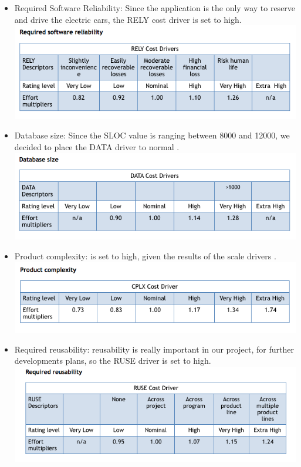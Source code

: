 \documentclass{article}
\begin{document}
\begin{flushleft}
\begin{itemize}
\item Required Software Reliability:
Since the application is the only way to reserve and drive the electric cars, the RELY cost driver is set to high.\\
\vspace{0.5cm}
\includegraphics[scale=0.5]{cocomo/1_RELY}
\vspace{0.5cm}
\item Database size: 
Since the SLOC value is ranging between 8000 and 12000, we decided to place the DATA driver to normal .\\
\vspace{0.5cm}
\includegraphics[scale=0.5]{cocomo/2_DATA}
\vspace{0.5cm}
\item Product complexity:  is set to high, given the results of the scale drivers .\\
\vspace{0.5cm}
\includegraphics[scale=0.5]{cocomo/3_CPLX}
\vspace{0.5cm}
\item Required reusability: reusability is really important in our project, for further developments plans, so the RUSE driver is set to high.\\
\vspace{0.5cm}
\includegraphics[scale=0.5]{cocomo/4_RUSE}

\end{itemize}
\end{flushleft}
\end{document}
